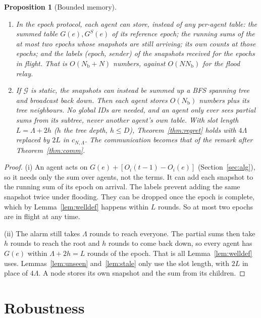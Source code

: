 \documentclass[11pt]{article}
\newtheorem{proposition}[theorem]{Proposition}
\theoremstyle{definition}
\newcommand{\Nb}{N_{\mathrm b}}
\newcommand{\cG}{\mathcal{G}}
\begin{document}
\begin{proposition}[Bounded memory]\label{prop:memory}
\begin{enumerate}[nosep,label=(\roman*)]
\item In the epoch protocol, each agent can store, instead of any per-agent table: the summed table $G(e),G^S(e)$ of
its reference epoch; the running sums of the at most two epochs whose snapshots are still arriving; its own counts at
those epochs; and the labels (epoch, sender) of the snapshots received for the epochs in flight. That is
$O(\Nb+N)$ numbers, against $O(N\Nb)$ for the flood relay.
\item If $\cG$ is static, the snapshots can instead be summed up a BFS spanning tree and broadcast back down. Then each
agent stores $O(\Nb)$ numbers plus its tree neighbours. No global IDs are needed, and an agent only ever sees partial
sums from its subtree, never another agent's own table. With slot length $L=\Lambda+2h$ ($h$ the tree depth, $h\le D$),
Theorem~\ref{thm:regret} holds with $4\Lambda$ replaced by $2L$ in $c_{N,\Lambda}$. The communication becomes that of the
remark after Theorem~\ref{thm:comm}.
\end{enumerate}
\end{proposition}
\begin{proof}
(i) An agent acts on $G(e)+[O_i(t-1)-O_i(e)]$ (Section~\ref{sec:alg}), so it needs only the sum over agents, not the
terms. It can add each snapshot to the running sum of its epoch on arrival. The labels prevent adding the same snapshot
twice under flooding. They can be dropped once the epoch is complete, which by Lemma~\ref{lem:welldef} happens within
$L$ rounds. So at most two epochs are in flight at any time.

(ii) The alarm still takes $\Lambda$ rounds to reach everyone. The partial sums then take $h$ rounds to reach the root
and $h$ rounds to come back down, so every agent has $G(e)$ within $\Lambda+2h=L$ rounds of the epoch. That is all
Lemma~\ref{lem:welldef} uses. Lemmas~\ref{lem:unseen} and~\ref{lem:stale} only use the slot length, with $2L$ in place of
$4\Lambda$. A node stores its own snapshot and the sum from its children.
\end{proof}

\section{Robustness}\label{sec:robust}
\end{document}

